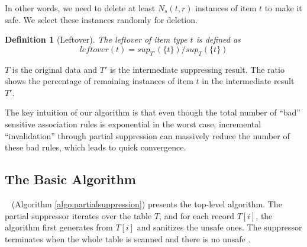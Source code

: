 In other words, we need to delete at least $N_s(t, r)$ instances of item $t$ to make it safe. We select these instances randomly for deletion.
\newtheorem{Definition}{Definition}

\begin{Definition}[Leftover]
 The leftover of item type $t$ is defined as
\begin{equation}
leftover(t)={sup_{T'}(\{t\})}/{sup_T(\{t\})}
\end{equation}
\end{Definition}
$T$ is the original data and $T'$ is the intermediate suppressing result.
The ratio shows the percentage of remaining instances of item $t$
in the intermediate result $T'$.


The key intuition of our algorithm is that even though the total number of
``bad'' sensitive association rules is exponential in the worst case, 
incremental ``invalidation'' through partial suppression 
can massively reduce the number of these bad rules, 
which leads to quick convergence.
%

\subsection{The Basic Algorithm}
\label{sec:basic}

\PartialSuppression~ (Algorithm \ref{algo:partialsuppression}) presents the
top-level algorithm. The partial suppressor iterates over the table $T$, and
for each record $T[i]$, the algorithm first generates  \qids from $T[i]$ and
sanitizes the unsafe ones. The suppressor terminates when the whole table is
scanned and there is no unsafe \qid.

